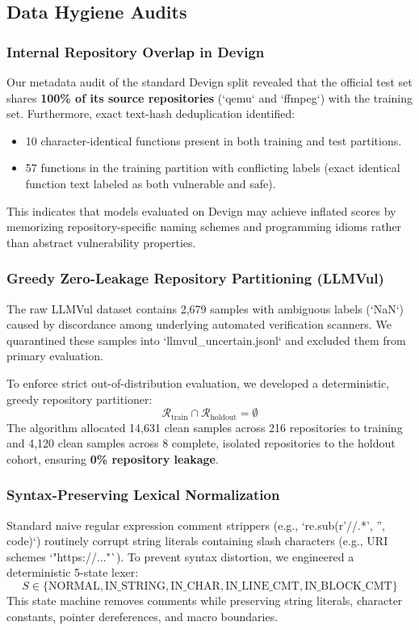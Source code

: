 \documentclass[conference]{IEEEtran}
\begin{document}
\subsection{Data Hygiene Audits}

\subsubsection{Internal Repository Overlap in Devign}
Our metadata audit of the standard Devign split revealed that the official test set shares \textbf{100\% of its source repositories} (`qemu` and `ffmpeg`) with the training set. Furthermore, exact text-hash deduplication identified:
\begin{itemize}
    \item 10 character-identical functions present in both training and test partitions.
    \item 57 functions in the training partition with conflicting labels (exact identical function text labeled as both vulnerable and safe).
\end{itemize}
This indicates that models evaluated on Devign may achieve inflated scores by memorizing repository-specific naming schemes and programming idioms rather than abstract vulnerability properties.

\subsubsection{Greedy Zero-Leakage Repository Partitioning (LLMVul)}
The raw LLMVul dataset contains 2,679 samples with ambiguous labels (`NaN`) caused by discordance among underlying automated verification scanners. We quarantined these samples into `llmvul_uncertain.jsonl` and excluded them from primary evaluation.

To enforce strict out-of-distribution evaluation, we developed a deterministic, greedy repository partitioner:
\begin{equation}
\mathcal{R}_{\text{train}} \cap \mathcal{R}_{\text{holdout}} = \emptyset
\end{equation}
The algorithm allocated 14,631 clean samples across 216 repositories to training and 4,120 clean samples across 8 complete, isolated repositories to the holdout cohort, ensuring \textbf{0\% repository leakage}.

\subsubsection{Syntax-Preserving Lexical Normalization}
Standard naive regular expression comment strippers (e.g., `re.sub(r'//.*', '', code)`) routinely corrupt string literals containing slash characters (e.g., URI schemes `"https://..."`). To prevent syntax distortion, we engineered a deterministic 5-state lexer:
\begin{equation}
S \in \{\text{NORMAL}, \text{IN\_STRING}, \text{IN\_CHAR}, \text{IN\_LINE\_CMT}, \text{IN\_BLOCK\_CMT}\}
\end{equation}
This state machine removes comments while preserving string literals, character constants, pointer dereferences, and macro boundaries.
\end{document}
